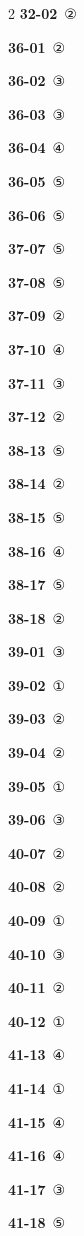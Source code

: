 \documentclass[10pt,a4paper]{article}
\begin{document}
\begin{multicols}{2}
\noindent\textbf{32-02}\ ②\par
\noindent\textbf{36-01}\ ②\par
\noindent\textbf{36-02}\ ③\par
\noindent\textbf{36-03}\ ③\par
\noindent\textbf{36-04}\ ④\par
\noindent\textbf{36-05}\ ⑤\par
\noindent\textbf{36-06}\ ⑤\par
\noindent\textbf{37-07}\ ⑤\par
\noindent\textbf{37-08}\ ⑤\par
\noindent\textbf{37-09}\ ②\par
\noindent\textbf{37-10}\ ④\par
\noindent\textbf{37-11}\ ③\par
\noindent\textbf{37-12}\ ②\par
\noindent\textbf{38-13}\ ⑤\par
\noindent\textbf{38-14}\ ②\par
\noindent\textbf{38-15}\ ⑤\par
\noindent\textbf{38-16}\ ④\par
\noindent\textbf{38-17}\ ⑤\par
\noindent\textbf{38-18}\ ②\par
\noindent\textbf{39-01}\ ③\par
\noindent\textbf{39-02}\ ①\par
\noindent\textbf{39-03}\ ②\par
\noindent\textbf{39-04}\ ②\par
\noindent\textbf{39-05}\ ①\par
\noindent\textbf{39-06}\ ③\par
\noindent\textbf{40-07}\ ②\par
\noindent\textbf{40-08}\ ②\par
\noindent\textbf{40-09}\ ①\par
\noindent\textbf{40-10}\ ③\par
\noindent\textbf{40-11}\ ②\par
\noindent\textbf{40-12}\ ①\par
\noindent\textbf{41-13}\ ④\par
\noindent\textbf{41-14}\ ①\par
\noindent\textbf{41-15}\ ④\par
\noindent\textbf{41-16}\ ④\par
\noindent\textbf{41-17}\ ③\par
\noindent\textbf{41-18}\ ⑤\par

\end{multicols}
\end{document}
